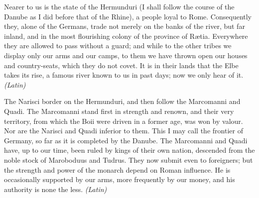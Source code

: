 
Nearer to us is the state of the Hermunduri (I shall follow the course of the Danube as I did before that of the Rhine), a people loyal to Rome. Consequently they, alone of the Germans, trade not merely on the banks of the river, but far inland, and in the most flourishing colony of the province of Rætia. Everywhere they are allowed to pass without a guard; and while to the other tribes we display only our arms and our camps, to them we have thrown open our houses and country-seats, which they do not covet. It is in their lands that the Elbe takes its rise, a famous river known to us in past days; now we only hear of it. \emph{(Latin)}


The Narisci border on the Hermunduri, and then follow the Marcomanni and Quadi. The Marcomanni stand first in strength and renown, and their very territory, from which the Boii were driven in a former age, was won by valour. Nor are the Narisci and Quadi inferior to them. This I may call the frontier of Germany, so far as it is completed by the Danube. The Marcomanni and Quadi have, up to our time, been ruled by kings of their own nation, descended from the noble stock of Maroboduus and Tudrus. They now submit even to foreigners; but the strength and power of the monarch depend on Roman influence. He is occasionally supported by our arms, more frequently by our money, and his authority is none the less. \emph{(Latin)}


